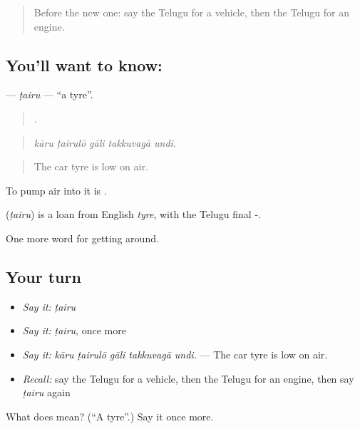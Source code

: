 \begin{quote}
Before the new one: say the Telugu for a vehicle, then the Telugu for an engine.
\end{quote}

\subsection*{You'll want to know: }
\textbf{} — \emph{ṭairu} — \textquotedblleft{}a tyre\textquotedblright{}.

\begin{quote}
    .
\end{quote}

\begin{quote}
\emph{kāru ṭairulō gāli takkuvagā undi.}
\end{quote}

\begin{quote}
The car tyre is low on air.
\end{quote}

To pump air into it is  .

\begin{cousinweb}
\textbf{} (\emph{ṭairu}) is a loan from English \emph{tyre}, with the Telugu final -.
\end{cousinweb}

\begin{grammarlens}[title={What you've built}]
One more word for getting around.
\end{grammarlens}

\subsection*{Your turn}
\begin{itemize}
\raggedright
  \item \emph{Say it:} \emph{ṭairu}
  \item \emph{Say it:} \emph{ṭairu}, once more
  \item \emph{Say it:} \emph{kāru ṭairulō gāli takkuvagā undi.} — The car tyre is low on air.
  \item \emph{Recall:} say the Telugu for a vehicle, then the Telugu for an engine, then say \emph{ṭairu} again
\end{itemize}

\begin{tcolorbox}[breakable,colback=teal!4,colframe=teal!35!black,title={Before you move on}]
What does  mean? (\textquotedblleft{}A tyre\textquotedblright{}.) Say it once more.
\end{tcolorbox}
